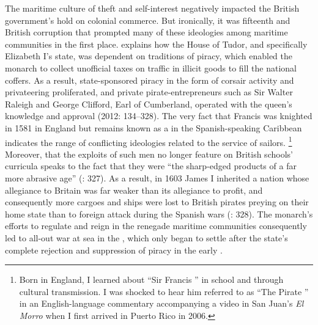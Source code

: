 The maritime culture of theft and self-interest negatively impacted the British government’s hold on colonial commerce. But ironically, it was fifteenth and  British corruption that prompted many of these ideologies among maritime communities in the first place. \citeauthor{Bicheno2012} explains how the House of Tudor, and specifically Elizabeth I’s state, was dependent on traditions of piracy, which enabled the monarch to collect unofficial taxes on traffic in illicit goods to fill the national coffers. As a result,  state-sponsored piracy in the form of corsair activity and privateering proliferated, and private pirate-entrepreneurs such as Sir Walter Raleigh and George Clifford, Earl of Cumberland, operated with the queen’s knowledge and approval (2012: 134–328). The very fact that Francis  was knighted in 1581 in England but remains known as a  in the Spanish-speaking Caribbean indicates the range of conflicting ideologies related to the service of sailors. \footnote{Born in England, I learned about “Sir Francis ” in school and through cultural transmission. I was shocked to hear him referred to as “The Pirate ” in an English-language commentary accompanying a video in San Juan’s \textit{El Morro} when I first arrived in Puerto Rico in 2006.} Moreover, that the exploits of such men no longer feature on British schools’ curricula speaks to the fact that they were “the sharp-edged products of a far more abrasive age” (\citealt{Bicheno2012}: 327). As a result, in 1603 James I inherited a  nation whose allegiance to Britain was far weaker than its allegiance to profit, and consequently more cargoes and ships were lost to British pirates preying on their home state than to foreign attack during the Spanish wars (\citealt{Bicheno2012}: 328). The monarch’s efforts to regulate and reign in the renegade maritime communities consequently led to all-out war at sea in the , which only began to settle after the state’s complete rejection and suppression of piracy in the early . 

